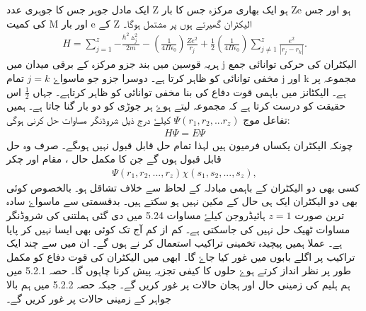 ایک مادل جوہر جس کا جوہری عدد Z ہو ایک بھاری مرکزہ جس کا بار Ze ہو اور جس کی کمیت M اور بار e کے Z الیکٹران گھیرتے ہوں پر مشتمل ہوگا۔
\begin{align}
H=\sum_{j=1}^{z} { -\frac{h^2 \vartriangle^2 _{j} }{2m}-(\frac{1}{4\Pi\epsilon_{0}})  \frac{Ze^2}{r_{j}} } + \frac{1}{2}(\frac{1}{4\Pi\epsilon_{0}}) \sum_{j\neq 1}^{z} \frac{e^2}{|r_{j} - r_{k} |}. 
\end{align}
ہریہ قوسین میں بند جزو مرکزہ کے برقی میدان میں j الیکٹران کی حرکی توانائی جمع مخفی توانائی کو ظاہر کرتا ہے۔ دوسرا جزو جو ماسواۓ $ j=k $ تمام j اور k مجموعہ پر ہے۔ الیکٹانز میں باہمی قوت دفاع کی بنا مخفی توانائی کو ظاہر کرتاہے۔ جہاں $ \frac{1}{2}
$ اس حقیقت کو درست کرتا ہے کہ مجموعہ لیتے ہوۓ ہر جوڑی کو دو بار گنا جاتا ہے۔ ہمیں تفاعل موج $ \Psi(r_{1} , r_{2}, ...r_{z}) $ کیلۓ درج ذیل شروڈنگر مساوات حل کرنی ہوگی:
\begin{align}
 H\Psi=E\Psi
\end{align}
چونکہ الیکٹران یکساں فرمیون ہیں لہذا تمام حل قابل قبول نہیں ہوںگے۔ صرف وہ حل قابل قبول ہوں گے جن کا مکمل حال ، مقام اور چکر 
\begin{align}
 \Psi(r_{1},r_{2},...,r_{z}) \chi(s_{1},s_{2},...,s_{z}), 
\end{align}
کسی بھی دو الیکٹران کے باہمی مبادلہ کے لحاظ سے خلاف تشاقل ہو۔ بالخصوص کوئی بھی دو الیکٹران ایک ہی حال کے مکین نہیں ہو سکتے ہیں۔ بدقسمتی سے ماسواۓ سادہ ترین صورت $ z=1 $  ہائیڈروجن کیلۓ مساوات 5.24 میں دی گئی ہملتنی کی شروڈنگر مساوات ٹھیک حل نہیں کی جاسکتی ہے۔ کم از کم آج تک کوئی بھی ایسا نہیں کر پایا ہے۔ عملا ہمیں پیچیدہ تخمینی تراکیب استعمال کر نے ہوں گے۔ ان میں سے چند ایک تراکیب پر اگلے بابوں میں غور کیا جاۓ گا۔ ابھی میں الیکٹران کی قوت دفاع کو مکمل طور پر نظر انداز کرتے ہوۓ حلوں کا کیفی تجزیہ پیش کرنا چاہوں گا۔ حصہ 5.2.1 میں ہم ہلیم کی زمینی حال اور ہجان  حالات پر غور کریں گے۔ جبکہ حصہ 5.2.2 میں ہم بالا جواہر کے زمینی حالات پر غور کریں گے۔

